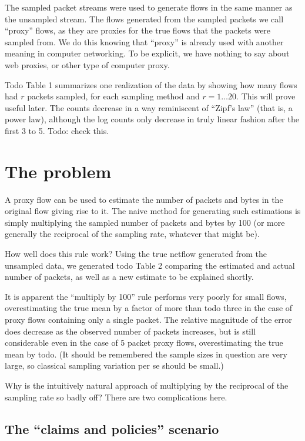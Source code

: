 \documentclass{paper}
\begin{document}
The sampled packet streams were used to generate flows in the same manner as
the unsampled stream. The flows generated from the sampled packets we call
``proxy'' flows, as they are proxies for the true flows that the packets were
sampled from. We do this knowing that ``proxy'' is already used with another
meaning in computer networking. To be explicit, we have nothing to say about
web proxies, or other type of computer proxy.

Todo Table 1 summarizes one realization of the data by showing how many flows
had $r$ packets sampled, for each sampling method and $r = 1 \dots 20$. This
will prove useful later. The counts decrease in a way reminiscent of ``Zipf's
law'' (that is, a power law), although the log counts only decrease in truly
linear fashion after the first 3 to 5. Todo: check this.

\section{The problem}

A proxy flow can be used to estimate the number of packets and bytes in the
original flow giving rise to it. The naive method for generating such
estimations is simply multiplying the sampled number of packets and bytes by
100 (or more generally the reciprocal of the sampling rate, whatever that might
be).

How well does this rule work? Using the true netflow generated from the
unsampled data, we generated todo Table 2 comparing the estimated and actual
number of packets, as well as a new estimate to be explained shortly.

It is apparent the ``multiply by 100'' rule performs very poorly for small
flows, overestimating the true mean by a factor of more than todo three in the
case of proxy flows containing only a single packet. The relative magnitude of
the error does decrease as the observed number of packets increases, but is
still considerable even in the case of 5 packet proxy flows, overestimating the
true mean by todo. (It should be remembered the sample sizes in question are
very large, so classical sampling variation per se should be small.)

Why is the intuitively natural approach of multiplying by the reciprocal of the
sampling rate so badly off? There are two complications here.

\subsection{The ``claims and policies'' scenario}
\end{document}
